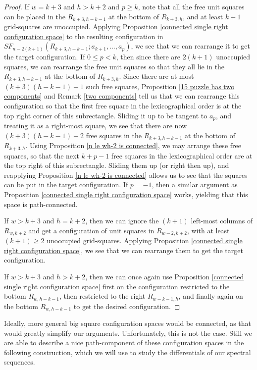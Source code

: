 \documentclass[pagebackref,colorlinks,citecolor=blue,linkcolor=blue,urlcolor=blue,filecolor=blue]{article}
\theoremstyle{definition}\newtheorem{definition}[thm]{Definition}
\theoremstyle{definition}
\begin{document}
\begin{proof}
If $w=k+3$ and $h>k+2$ and $p\ge k$, note that all the free unit squares can be placed in the $R_{k+3,h-k-1}$ at the bottom of $R_{k+3,h}$, and at least $k+1$ grid-squares are unoccupied.
Applying Proposition \ref{connected single right configuration space} to the resulting configuration in $SF_{n-2(k+1)}(R_{k+3,h-k-1}; a_{k+1},\dots, a_{p})$, we see that we can rearrange it to get the target configuration.
If $0\le p<k$, then since there are $2(k+1)$ unoccupied squares, we can rearrange the free unit squares so that they all lie in the $R_{k+3,h-k-1}$ at the bottom of $R_{k+3,h}$.
Since there are at most $(k+3)(h-k-1)-1$ such free squares, Proposition \ref{15 puzzle has two components} and Remark \ref{two components} tell us that we can rearrange this configuration so that the first free square in the lexicographical order is at the top right corner of this subrectangle.
Sliding it up to be tangent to $a_{p}$, and treating it as a right-most square, we see that there are now $(k+3)(h-k-1)-2$ free squares in the $R_{k+3,h-k-1}$ at the bottom of $R_{k+3,h}$.
Using Proposition \ref{n le wh-2 is connected}, we may arrange these free squares, so that the next $k+p-1$ free squares in the lexicographical order are at the top right of this subrectangle.
Sliding them up (or right then up), and reapplying Proposition \ref{n le wh-2 is connected} allows us to see that the squares can be put in the target configuration.
If $p=-1$, then a similar argument as Proposition \ref{connected single right configuration space} works, yielding that this space is path-connected.

If $w>k+3$ and $h=k+2$, then we can ignore the $(k+1)$ left-most columns of $R_{w,k+2}$ and get a configuration of unit squares in $R_{w-2,k+2}$, with at least $(k+1)\ge2$ unoccupied grid-squares.
Applying Proposition \ref{connected single right configuration space}, we see that we can rearrange them to get the target configuration.

If $w>k+3$ and $h>k+2$, then we can once again use Proposition \ref{connected single right configuration space} first on the configuration restricted to the bottom $R_{w,h-k-1}$, then restricted to the right $R_{w-k-1,h}$, and finally again on the bottom $R_{w,h-k-1}$ to get the desired configuration.
\end{proof}

Ideally, more general big square configuration spaces would be connected, as that would greatly simplify our arguments.
Unfortunately, this is not the case.
Still we are able to describe a nice path-component of these configuration spaces in the following construction, which we will use to study the differentials of our spectral sequences.
\end{document}
